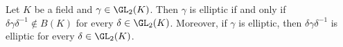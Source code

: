Let $K$ be a field and $\gamma\in\GL_2(K)$. Then $\gamma$ is elliptic if and only if $\delta\gamma\delta^{-1}\notin B(K)$ for every
$\delta\in\GL_2(K)$. Moreover, if $\gamma$ is elliptic, then $\delta\gamma\delta^{-1}$ is elliptic for every $\delta\in\GL_2(K)$.
